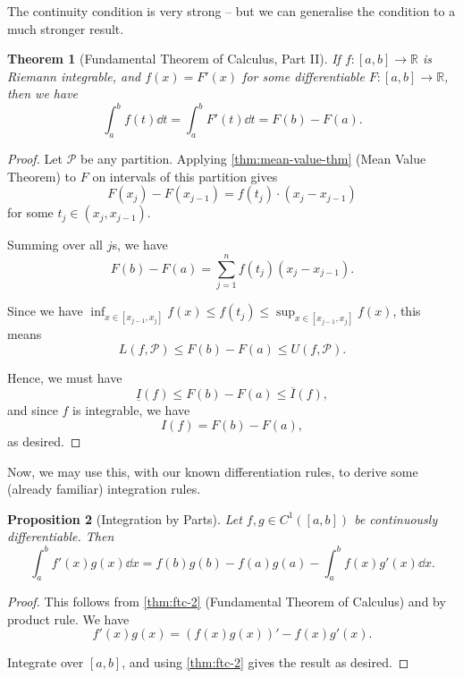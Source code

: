 \documentclass[11pt]{article}
\numberwithin{equation}{section}
\newtheorem{theorem}{Theorem}[section]
\newtheorem{proposition}[theorem]{Proposition}
\theoremstyle{definition}
\theoremstyle{remark}
\newcommand{\pqty}[1]{\left(#1\right)}
\newcommand{\ccintv}[2]{[#1,#2]}
\newcommand{\oointv}[2]{(#1,#2)}
\newcommand{\functiondomain}[3]{#1:#2\to #3}
\newcommand{\RR}{\mathbb R}
\newcommand{\contClass}[1]{C^{#1}}
\newcommand{\partition}{\mathcal P}
\newcommand{\upperSum}{U}
\newcommand{\lowerSum}{L}
\newcommand{\upperI}{\overline I}
\newcommand{\lowerI}{\underline I}
\begin{document}
The continuity condition is very strong -- but we can generalise the condition to a much stronger result.

\begin{theorem}[Fundamental Theorem of Calculus, Part II]\label{analysis-unit-0170}
    \label{thm:ftc-2}%
    If \(\functiondomain{f}{\ccintv{a}{b}}{\RR}\) is Riemann integrable, and \(f\pqty{x} = F'\pqty{x}\) for some differentiable \(\functiondomain{F}{\ccintv{a}{b}}{\RR}\), then we have
    \[
        \int_{a}^{b} f\pqty{t} \dd{t} = \int_{a}^{b} F'\pqty{t} \dd{t} = F\pqty{b} - F\pqty{a}.
    \]
\end{theorem}

\begin{proof}
    Let \(\partition\) be any partition. Applying \autoref{thm:mean-value-thm} (Mean Value Theorem) to \(F\) on intervals of this partition gives
    \[
        F\pqty{x_j} - F\pqty{x_{j - 1}} = f\pqty{t_j} \cdot \pqty{x_j - x_{j - 1}}
    \]
    for some \(t_j \in \oointv{x_j}{x_{j - 1}}\).

    Summing over all \(j\)s, we have
    \[
        F\pqty{b} - F\pqty{a} = \sum_{j = 1}^{n} f\pqty{t_j} \pqty{x_j - x_{j - 1}}.
    \]

    Since we have \(\inf_{x \in \ccintv{x_{j - 1}}{x_j}} f\pqty{x} \leq f\pqty{t_j} \leq \sup_{x \in \ccintv{x_{j - 1}}{x_j}} f\pqty{x}\), this means
    \[
        \lowerSum\pqty{f, \partition} \leq F\pqty{b} - F\pqty{a} \leq \upperSum\pqty{f, \partition}.
    \]

    Hence, we must have
    \[
        \lowerI\pqty{f} \leq F\pqty{b} - F\pqty{a} \leq \upperI\pqty{f},
    \]
    and since \(f\) is integrable, we have
    \[
        I\pqty{f} = F\pqty{b} - F\pqty{a},
    \]
    as desired.
\end{proof}

Now, we may use this, with our known differentiation rules, to derive some (already familiar) integration rules.

\begin{proposition}[Integration by Parts]\label{analysis-unit-0171}
    \label{prop:integration-by-parts}%
    Let \(f, g \in \contClass{1} \pqty{\ccintv{a}{b}}\) be continuously differentiable. Then
    \[
        \int_{a}^{b} f'\pqty{x} g\pqty{x} \dd{x} = f\pqty{b} g\pqty{b} - f\pqty{a} g\pqty{a} - \int_{a}^{b} f\pqty{x} g'\pqty{x} \dd{x}.
    \]
\end{proposition}

\begin{proof}
    This follows from \autoref{thm:ftc-2} (Fundamental Theorem of Calculus) and by product rule. We have
    \[
        f'\pqty{x} g\pqty{x} = \pqty{f\pqty{x} g\pqty{x}}' - f\pqty{x} g'\pqty{x}.
    \]

    Integrate over \(\ccintv{a}{b}\), and using \autoref{thm:ftc-2} gives the result as desired.
\end{proof}
\end{document}
